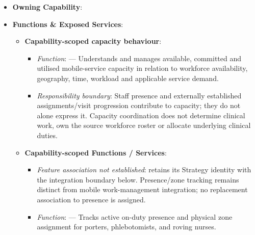 \begin{itemize}

\item 
\textbf{Owning Capability}: \texttt{}



\item 
\textbf{Functions \& Exposed Services}:


\begin{itemize}

\item 
\textbf{Capability-scoped capacity behaviour}:


\begin{itemize}

\item 
\emph{Function}: \texttt{} — Understands and manages available, committed and utilised mobile-service capacity in relation to workforce availability, geography, time, workload and applicable service demand.



\item 
\emph{Responsibility boundary}: Staff presence and externally established assignments/\allowbreak{}visit progression contribute to capacity; they do not alone express it. Capacity coordination does not determine clinical work, own the source workforce roster or allocate underlying clinical duties.



\end{itemize}


\item 
\textbf{Capability-scoped Functions /\allowbreak{} Services}:


\begin{itemize}

\item 
\emph{Feature association not established}: \texttt{} retains its Strategy identity with the integration boundary below. Presence/\allowbreak{}zone tracking remains distinct from mobile work-management integration; no replacement association to presence is assigned.



\item 
\emph{Function}: \texttt{} — Tracks active on-duty presence and physical zone assignment for porters, phlebotomists, and roving nurses.




\end{itemize}
\end{itemize}
\end{itemize}
